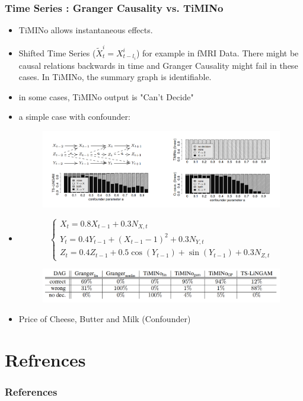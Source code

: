 \documentclass{beamer}
\newcommand{\eps}{{N}}
\begin{document}
\begin{frame}
\frametitle{Time Series : Granger Causality vs. TiMINo}
\begin{itemize}
\item TiMINo allows instantaneous effects.
\item Shifted Time Series ($\tilde{X}_t^i = X_{t-l_i}^i$) \hspace{0.5cm} for example in fMRI Data.  There might be causal relations backwards in time and Granger Causality might fail in these cases. In TiMINo, the summary graph is identifiable.
\item in some cases, TiMINo output is "Can't Decide"
\end{itemize}
\end{frame}



\begin{frame}
\begin{itemize}
\item a simple case with confounder:
\begin{figure}
	\includegraphics[scale=0.21]{timino.png}
\end{figure}

\item
\tiny{
\begin{equation*}
\begin{cases}
X_t=0.8 X_{t-1} + 0.3 \eps_{X,t}\\
Y_t=0.4 Y_{t-1} + (X_{t-1}-1)^2 +0.3\eps_{Y,t}\\
Z_t=0.4 Z_{t-1} + 0.5 \cos(Y_{t-1}) + \sin(Y_{t-1}) +0.3\eps_{Z,t}
\end{cases}
\end{equation*}
\begin{figure}
	\includegraphics[scale=0.2]{nonlin.png}
\end{figure}
}
\item Price of Cheese, Butter and Milk (Confounder)

\end{itemize}
\end{frame}
\section{Refrences}
\begin{frame}
\frametitle{References}
\scriptsize{


}
\end{frame}
\end{document}

